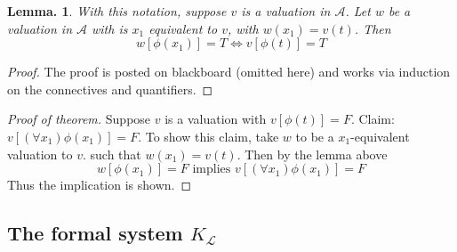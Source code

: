 \documentclass[a4paper,oneside,11pt,DIV=12,parskip=half]{scrartcl}
\newcommand{\LL}{\mathcal L}
\newcommand{\A}{\mathcal A}
\theoremstyle{plain}
\newtheorem{lemma}[theorem]{Lemma.}
\theoremstyle{definition}
\newtheorem{remark, definition}[theorem]{Remark and Definition.}
\newtheorem{lemma, definition}[theorem]{Lemma and Definition.}
\newtheorem{theorem, definition}[theorem]{Theorem and Definition.}
\theoremstyle{remark}
\newtheorem*{remark, example}{\textbf{Remark and Exercise}}
\begin{document}
\begin{lemma}
With this notation, suppose $v$ is a valuation in $\A$. Let $w$ be a valuation in $\A$ with is $x_1$ equivalent to $v$, with $w(x_1) = v(t)$. Then 
    \[ w[\phi(x_1)] = T \Leftrightarrow v[\phi(t)] = T \]
\end{lemma}

\begin{proof}
The proof is posted on blackboard (omitted here) and works via induction on the connectives and quantifiers.
\end{proof}

\begin{proof}[Proof of theorem]
Suppose $v$ is a valuation with $v[\phi(t)] = F$.
Claim: $v[(\forall x_1) \phi(x_1)] = F$.
To show this claim, take $w$ to be a $x_1$-equivalent valuation to $v$. such that $w(x_1) = v(t)$.
Then by the lemma above 
    \[ w[\phi(x_1)] = F \text{ implies } v[(\forall x_1) \phi(x_1)] = F \]
Thus the implication is shown.
\end{proof}

\subsection{ The formal system $K_{\LL}$ }
\end{document}
